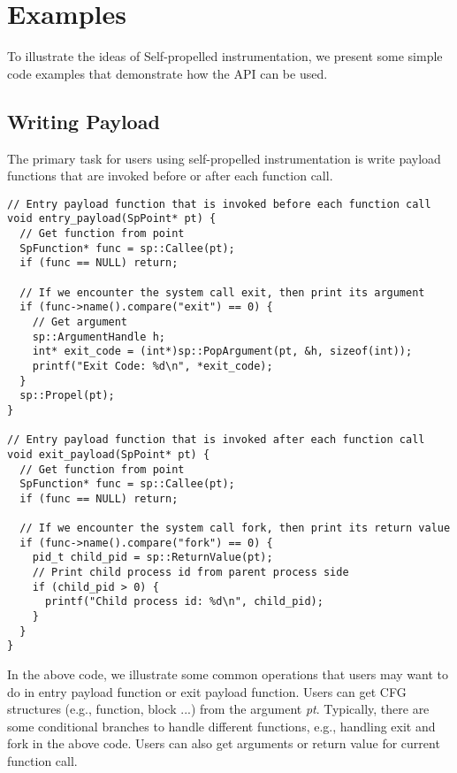 \section{Examples}
To illustrate the ideas of Self-propelled instrumentation, we present some
simple code examples that demonstrate how the API can be used.

\subsection{Writing Payload}
The primary task for users using self-propelled instrumentation is write payload
functions that are invoked before or after each function call.
\lstset{numbers=left}
\begin{lstlisting}[caption=Writing payload functions]
// Entry payload function that is invoked before each function call
void entry_payload(SpPoint* pt) {
  // Get function from point
  SpFunction* func = sp::Callee(pt);
  if (func == NULL) return;

  // If we encounter the system call exit, then print its argument
  if (func->name().compare("exit") == 0) {
    // Get argument
    sp::ArgumentHandle h;
    int* exit_code = (int*)sp::PopArgument(pt, &h, sizeof(int));
    printf("Exit Code: %d\n", *exit_code);
  }
  sp::Propel(pt);
}

// Entry payload function that is invoked after each function call
void exit_payload(SpPoint* pt) {
  // Get function from point
  SpFunction* func = sp::Callee(pt);
  if (func == NULL) return;

  // If we encounter the system call fork, then print its return value
  if (func->name().compare("fork") == 0) {
    pid_t child_pid = sp::ReturnValue(pt);
    // Print child process id from parent process side
    if (child_pid > 0) {
      printf("Child process id: %d\n", child_pid);
    }
  }
}
\end{lstlisting}
In the above code, we illustrate some common operations that users may want to
do in entry payload function or exit payload function.
Users can get CFG structures (e.g., function, block ...) from the argument {\em
  pt}.
Typically, there are some conditional branches to handle different functions,
e.g., handling exit and fork in the above code.
Users can also get arguments or return value for current function call.

